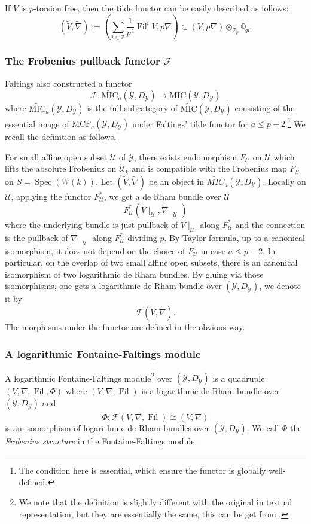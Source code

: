 \documentclass[12pt,twoside]{book}
\theoremstyle{plain}
\theoremstyle{definition}
\theoremstyle{remark}
\newcommand{\bZ}{{\mathbb Z}}
\newcommand{\mF}{{\mathcal F}}
\newcommand{\mU}{{\mathcal U}}
\newcommand{\mY}{{\mathcal Y}}
\DeclareMathOperator\Fil{Fil}
\DeclareMathOperator\Spec{Spec}
\newcommand{\MCF}{\mathrm{MCF}}
\newcommand{\MIC}{\mathrm{MIC}}
\newcommand{\Zp}{{\mathbb{Z}_p}}
\newcommand{\Qp}{{\mathbb{Q}_p}}
\numberwithin{equation}{section}
\begin{document}
If $V$ is $p$-torsion free, then the tilde functor can be easily described as follows:
\[(\widetilde{V},\widetilde{\nabla}):= \left(\sum_{i\in\bZ} \frac1{p^\ell}\Fil^iV,p\nabla\right)\subset (V,p\nabla)\otimes_{\Zp}\Qp.\]

\subsubsection{The Frobenius pullback functor $\mF$} Faltings also constructed a functor \cite{Fal89}
\[\mF\colon \widetilde{\MIC}_a(\mY,D_\mY) \rightarrow \MIC(\mY,D_\mY)\]
where $\widetilde{\MIC}_a(\mY,D_\mY)$ is the full subcategory of $\widetilde{\MIC}(\mY,D_\mY)$ consisting of the essential image of $\MCF_a(\mY,D_\mY)$ under Faltings' tilde functor for $a\leq p-2$.\footnote{The condition here is essential, which ensure the functor is globally well-defined.} We recall the definition as follows.

For small affine open subset $\mU$ of $\mY$, there exists endomorphism $F_\mU$ on $\mU$ which lifts the absolute Frobenius on $\mU_k$ and is compatible with the Frobenius map $F_S$ on $S=\Spec(W(k))$. Let $(\widetilde{V},\widetilde{\nabla})$ be an object in $\widetilde{MIC}_a(\mY,D_\mY)$. Locally on $\mU$, applying the functor $F_{\mU}^*$, we get a de Rham bundle over $\mU$
\[F_{\mU}^*(\widetilde{V}\mid_{\mU},\widetilde{\nabla}\mid_{\mU})\]
where the underlying bundle is just pullback of $\widetilde{V}\mid_{\mU}$ along $F_{\mU}^*$ and the connection is the pullback of $\widetilde{\nabla}\mid_{\mU}$ along $F_{\mU}^*$ dividing $p$. By Taylor formula, up to a canonical isomorphism, it does not depend on the choice of $F_\mU$ in case $a\leq p-2$. In particular, on the overlap of two small affine open subsets, there is an canonical isomorphism of two logarithmic de Rham bundles. By gluing via those isomorphisms, one gets a logarithmic de Rham bundle over $(\mY,D_\mY)$, we denote it by
\[\mF(\widetilde{V},\widetilde{\nabla}).\]
The morphisms under the functor are defined in the obvious way.

\subsubsection{A logarithmic Fontaine-Faltings module}
A logarithmic Fontaine-Faltings module\footnote{We note that the definition is slightly different with the original \cite{Fal89} in textual representation, but they are essentially the same, this can be get from \cite[Section 2.3]{SYZ22}.} over $(\mY,D_\mY)$ is a quadruple $(V,\nabla,\Fil,\Phi)$ where $(V,\nabla,\Fil)$ is a logarithmic de Rham bundle over $(\mY,D_\mY)$ and
\[\Phi\colon \mF\widetilde{(V,\nabla,\Fil)} \cong (V,\nabla)\]
is an isomorphism of logarithmic de Rham bundles over $(\mY,D_\mY)$. We call $\Phi$ the \emph{Frobenius structure} in the Fontaine-Faltings module.
\end{document}
